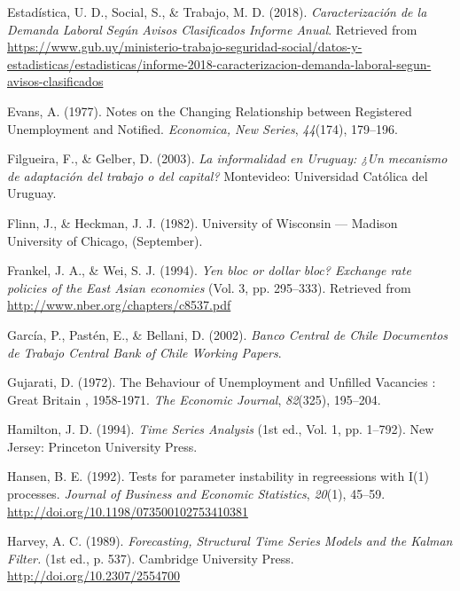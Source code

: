 \documentclass[12pt,oneside]{reedthesis}
\begin{document}
\leavevmode\hypertarget{ref-MTSS2018}{}%
Estadística, U. D., Social, S., \& Trabajo, M. D. (2018). \emph{Caracterización de la Demanda Laboral Según Avisos Clasificados Informe Anual}. Retrieved from \url{https://www.gub.uy/ministerio-trabajo-seguridad-social/datos-y-estadisticas/estadisticas/informe-2018-caracterizacion-demanda-laboral-segun-avisos-clasificados}

\leavevmode\hypertarget{ref-Evans1977}{}%
Evans, A. (1977). Notes on the Changing Relationship between Registered Unemployment and Notified. \emph{Economica, New Series}, \emph{44}(174), 179--196.

\leavevmode\hypertarget{ref-Filgueira2003}{}%
Filgueira, F., \& Gelber, D. (2003). \emph{La informalidad en Uruguay: ¿Un mecanismo de adaptación del trabajo o del capital?} Montevideo: Universidad Católica del Uruguay.

\leavevmode\hypertarget{ref-Flinn1982}{}%
Flinn, J., \& Heckman, J. J. (1982). University of Wisconsin --- Madison University of Chicago, (September).

\leavevmode\hypertarget{ref-Frankel1994}{}%
Frankel, J. A., \& Wei, S. J. (1994). \emph{Yen bloc or dollar bloc? Exchange rate policies of the East Asian economies} (Vol. 3, pp. 295--333). Retrieved from \url{http://www.nber.org/chapters/c8537.pdf}

\leavevmode\hypertarget{ref-BankChile2002}{}%
García, P., Pastén, E., \& Bellani, D. (2002). \emph{Banco Central de Chile Documentos de Trabajo Central Bank of Chile Working Papers}.

\leavevmode\hypertarget{ref-Gujarati1972}{}%
Gujarati, D. (1972). The Behaviour of Unemployment and Unfilled Vacancies : Great Britain , 1958-1971. \emph{The Economic Journal}, \emph{82}(325), 195--204.

\leavevmode\hypertarget{ref-Hamilton1994}{}%
Hamilton, J. D. (1994). \emph{Time Series Analysis} (1st ed., Vol. 1, pp. 1--792). New Jersey: Princeton University Press.

\leavevmode\hypertarget{ref-Hansen1992}{}%
Hansen, B. E. (1992). Tests for parameter instability in regreessions with I(1) processes. \emph{Journal of Business and Economic Statistics}, \emph{20}(1), 45--59. \url{http://doi.org/10.1198/073500102753410381}

\leavevmode\hypertarget{ref-Harvey1989}{}%
Harvey, A. C. (1989). \emph{Forecasting, Structural Time Series Models and the Kalman Filter.} (1st ed., p. 537). Cambridge University Press. \url{http://doi.org/10.2307/2554700}
\end{document}
